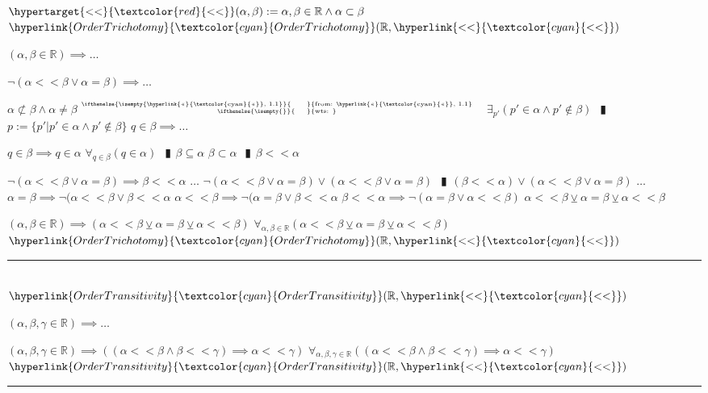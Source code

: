 \documentclass{book}
\newcommand{\df}[1]{\hypertarget{#1}{\textcolor{red}{#1}}}
\newcommand{\wff}[1]{\hypertarget{#1}{\fbox{\textcolor{red}{#1}}\phantom{--}}}
\newcommand{\rf}[1]{\hyperlink{#1}{\textcolor{cyan}{#1}}}
\newcommand{\abr}{:=}
\newcommand{\pipe}{$\phantom{(}\vrectangleblack\phantom{)}$}
\newcommand{\pr}[1]{\left(#1\right)}
\newcommand{\ann}[2]{%
  \hfill %
  $\stackrel%
  {\hbox{\tiny{\ifthenelse{\isempty{#1}}%
    {\phantom{from}}%
    {from: #1}}}}%
  {\hbox{\tiny{\ifthenelse{\isempty{#2}}%
    {\phantom{wts}}%
    {wts: #2}}}}$%
\ }
\begin{document}
$\df{<<}(\alpha, \beta) \abr \alpha, \beta \in \mathbb{R} \land \alpha \subset \beta$ \\

\wff{OrderTrichotomyR} $\rf{OrderTrichotomy}(\mathbb{R}, \rf{<<})$
\begin{enumerate}
  \lit $(\alpha, \beta \in \mathbb{R}) \implies \ldots$
  \begin{enumerate}
    \lit $\lnot(\alpha << \beta \lor \alpha = \beta) \implies \ldots$
    \begin{enumerate}
      \lit $\alpha \not \subset \beta \land \alpha \neq \beta$    \ann{\rf{<<}, 1.1}{}
      \lit $\exists_{p'}(p' \in \alpha \land p' \notin \beta)$ \pipe $p \abr \{p' | p' \in \alpha \land p' \notin \beta\}$
      \lit $q \in \beta \implies \ldots$
      \begin{enumerate}
      \end{enumerate}
      \lit $q \in \beta \implies q \in \alpha$
      \lit $\forall_{q \in \beta}(q \in \alpha)$ \pipe $\beta \subseteq \alpha$
      \lit $\beta \subset \alpha$ \pipe $\beta << \alpha$
    \end{enumerate}
    \lit $\lnot(\alpha << \beta \lor \alpha = \beta) \implies \beta << \alpha$
    \lit $\ldots$
    \lit $\lnot(\alpha << \beta \lor \alpha = \beta) \lor (\alpha << \beta \lor \alpha = \beta)$ \pipe $(\beta << \alpha) \lor (\alpha << \beta \lor \alpha = \beta)$
    \lit $\ldots$
    \lit $\alpha = \beta \implies \lnot(\alpha << \beta \lor \beta << \alpha$
    \lit $\alpha << \beta \implies \lnot(\alpha = \beta \lor \beta << \alpha$
    \lit $\beta << \alpha \implies  \lnot(\alpha = \beta \lor \alpha << \beta)$
    \lit $\alpha << \beta \veebar \alpha = \beta \veebar \alpha << \beta$
  \end{enumerate}
  \lit $(\alpha, \beta \in \mathbb{R}) \implies (\alpha << \beta \veebar \alpha = \beta \veebar \alpha << \beta)$
  \lit $\forall_{\alpha, \beta \in \mathbb{R}}(\alpha << \beta \veebar \alpha = \beta \veebar \alpha << \beta)$
  \lit $\rf{OrderTrichotomy}(\mathbb{R}, \rf{<<})$
\end{enumerate} \vspace{.75mm} \hrule \vspace{.75mm} \ \\

\wff{OrderTransitivityR} $\rf{OrderTransitivity}(\mathbb{R}, \rf{<<})$
\begin{enumerate}
  \lit $(\alpha, \beta, \gamma \in \mathbb{R}) \implies \ldots$
  \begin{enumerate}
  \end{enumerate}
  \lit $(\alpha, \beta, \gamma \in \mathbb{R}) \implies \pr{(\alpha << \beta \land \beta << \gamma) \implies \alpha << \gamma}$
  \lit $\forall_{\alpha, \beta, \gamma \in \mathbb{R}}\pr{(\alpha << \beta \land \beta << \gamma) \implies \alpha << \gamma}$
  \lit $\rf{OrderTransitivity}(\mathbb{R}, \rf{<<})$
\end{enumerate} \vspace{.75mm} \hrule \vspace{.75mm} \ \\
\end{document}
